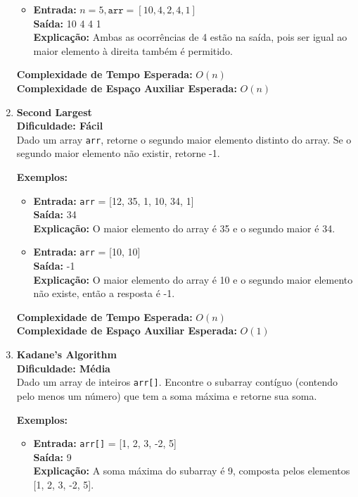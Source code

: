 \documentclass[a4paper,12pt]{article}
\begin{document}
\begin{enumerate}
\begin{itemize}
        \item \textbf{Entrada:} \( n = 5, \texttt{arr} = [10,4,2,4,1] \) \\
        \textbf{Saída:} 10 4 4 1 \\
        \textbf{Explicação:} Ambas as ocorrências de 4 estão na saída, pois ser igual ao maior elemento à direita também é permitido.
    \end{itemize}
    
    \textbf{Complexidade de Tempo Esperada:} \( O(n) \) \\
    \textbf{Complexidade de Espaço Auxiliar Esperada:} \( O(n) \)

    \item \textbf{Second Largest} \\
    \textbf{Dificuldade: Fácil} \\
    Dado um array \texttt{arr}, retorne o segundo maior elemento distinto do array. Se o segundo maior elemento não existir, retorne -1.

    \textbf{Exemplos:}
    \begin{itemize}
        \item \textbf{Entrada:} \texttt{arr} = [12, 35, 1, 10, 34, 1] \\
        \textbf{Saída:} 34 \\
        \textbf{Explicação:} O maior elemento do array é 35 e o segundo maior é 34.
        
        \item \textbf{Entrada:} \texttt{arr} = [10, 10] \\
        \textbf{Saída:} -1 \\
        \textbf{Explicação:} O maior elemento do array é 10 e o segundo maior elemento não existe, então a resposta é -1.
    \end{itemize}
    
    \textbf{Complexidade de Tempo Esperada:} \( O(n) \) \\
    \textbf{Complexidade de Espaço Auxiliar Esperada:} \( O(1) \)

    \item \textbf{Kadane's Algorithm} \\
    \textbf{Dificuldade: Média} \\
    Dado um array de inteiros \texttt{arr[]}. Encontre o subarray contíguo (contendo pelo menos um número) que tem a soma máxima e retorne sua soma.

    \textbf{Exemplos:}
    \begin{itemize}
        \item \textbf{Entrada:} \texttt{arr[]} = [1, 2, 3, -2, 5] \\
        \textbf{Saída:} 9 \\
        \textbf{Explicação:} A soma máxima do subarray é 9, composta pelos elementos [1, 2, 3, -2, 5].
        

\end{itemize}
\end{enumerate}
\end{document}
